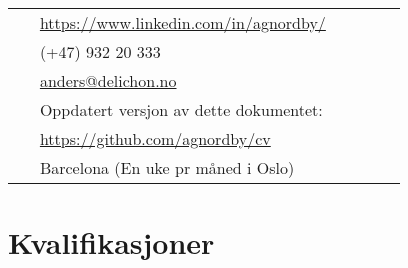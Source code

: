 \documentclass[10pt]{article} %
\begin{document}
\begin{paracol}{2}

\parbox[top][0.12\textheight][c]{\linewidth}{ %
	\vspace{-0.04\textheight} %
	\colorbox{shade}{ %
		\begin{supertabular}{p{0.05\linewidth}|p{0.775\linewidth}} %
			\raisebox{-1pt}{\faLinkedinSquare} & \href{https://www.linkedin.com/in/agnordby/}{https://www.linkedin.com/in/agnordby/} \\ %
			\raisebox{-1pt}{\faPhone} & (+47) 932 20 333 \\ %
			\raisebox{0pt}{\small\faEnvelope} & \href{mailto:anders@delichon.no}{anders@delichon.no} \\ %
			\raisebox{-1pt}{\faGithub} & Oppdatert versjon av dette dokumentet: \\ %
			\raisebox{-1pt}{} & \href{https://https://github.com/agnordby/cv}{https://github.com/agnordby/cv} \\ %
			\raisebox{-1pt}{\faHome} & Barcelona (En uke pr måned i Oslo) \\ %
		\end{supertabular}
	}
}


\section{Kvalifikasjoner}




\end{paracol}
\end{document}
